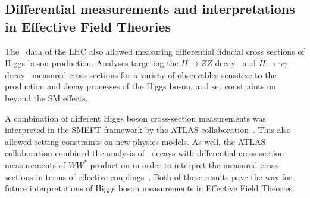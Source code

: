 \subsection{Differential measurements and interpretations in Effective Field Theories}
The \RunTwo\ data of the LHC also allowed measuring differential fiducial cross sections of Higgs boson production. Analyses targeting the $H \to ZZ$ decay~\cite{ATLAS:2020wny} and $H \to \gamma\gamma$ decay~\cite{hgammagammaDiff} measured cross sections for a variety of observables sensitive to the production and decay processes of the Higgs boson, and set constraints on beyond the SM effects.

A combination of different Higgs boson cross-section measurements was interpreted in the SMEFT framework by the ATLAS collaboration~\cite{ATLAS-CONF-2020-053}. This also allowed setting constraints on new physics models.
As well, the ATLAS collaboration combined the analysis of \HWW\ decays with differential cross-section measurements of $WW^*$ production in order to interpret the measured cross sections in terms of effective couplings~\cite{ATL-PHYS-PUB-2021-010}.
Both of these results pave the way for future interpretations of Higgs boson measurements in Effective Field Theories. %





